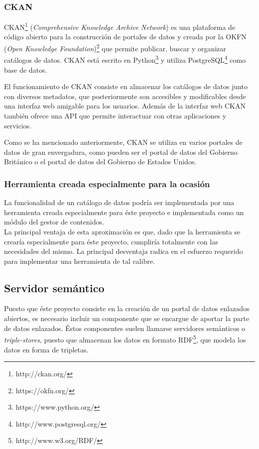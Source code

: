 \subsubsection{CKAN}
CKAN\footnote{http://ckan.org/} (\textit{Comprehensive Knowledge Archive Network}) es una plataforma de código abierto para la construcción de portales de datos y creada por la OKFN (\textit{Open Knowledge Foundation})\footnote{https://okfn.org/} que permite publicar, buscar y organizar catálogos de datos. CKAN está escrito en Python\footnote{https://www.python.org/} y utiliza PostgreSQL\footnote{http://www.postgresql.org/} como base de datos.

El funcionamiento de CKAN consiste en almacenar los catálogos de datos junto con diversos metadatos, que posteriormente son accesibles y modificables desde una interfaz web amigable para los usuarios.  Además de la interfaz web CKAN también ofrece una API que permite interactuar con otras aplicaciones y servicios.

Como se ha mencionado anteriormente, CKAN se utiliza en varios portales de datos de gran envergadura, como pueden ser el portal de datos del Gobierno Británico o el portal de datos del Gobierno de Estados Unidos.


\subsubsection{Herramienta creada especialmente para la ocasión}
La funcionalidad de un catálogo de datos podría ser implementada por una herramienta creada especialmente para éste proyecto e implementada como un módulo del gestor de contenidos.\\
La principal ventaja de esta aproximación es que, dado que la herramienta se crearía especialmente para éste proyecto, cumpliría totalmente con las necesidades del mismo.  La principal desventaja radica en el esfuerzo requerido para implementar una herramienta de tal calibre.



\subsection{Servidor semántico}
Puesto que éste proyecto consiste en la creación de un portal de datos enlazados abiertos, es necesario incluir un componente que se encargue de aportar la parte de datos enlazados.  Éstos componentes suelen llamarse servidores semánticos o \textit{triple-stores}, puesto que almacenan los datos en formato RDF\footnote{http://www.w3.org/RDF/}, que modela los datos en forma de tripletas.


